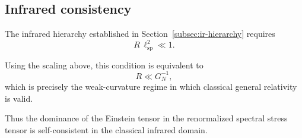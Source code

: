 \subsection{Infrared consistency}
  \label{subsec:ir-consistency}

  The infrared hierarchy established in
  Section~\ref{subsec:ir-hierarchy}
  requires
  \begin{equation}
    R\,\ell_{\mathrm{sp}}^2 \ll 1.
  \end{equation}

  Using the scaling above, this condition is equivalent to
  \begin{equation}
    R \ll G_N^{-1},
  \end{equation}
  which is precisely the weak-curvature regime in which classical
  general relativity is valid.

  Thus the dominance of the Einstein tensor in the renormalized spectral
  stress tensor is self-consistent in the classical infrared domain.
